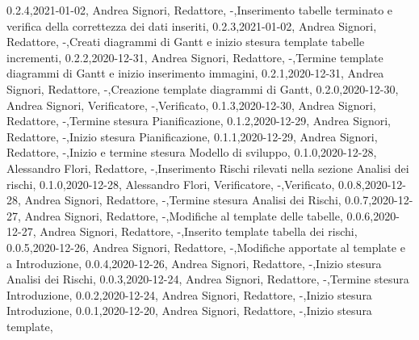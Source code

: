 {    {0.2.4,2021-01-02, Andrea Signori, Redattore, -,Inserimento tabelle terminato e verifica della correttezza dei dati inseriti},
    {0.2.3,2021-01-02, Andrea Signori, Redattore, -,Creati diagrammi di Gantt e inizio stesura template tabelle incrementi},
    {0.2.2,2020-12-31, Andrea Signori, Redattore, -,Termine template diagrammi di Gantt e inizio inserimento immagini},
    {0.2.1,2020-12-31, Andrea Signori, Redattore, -,Creazione template diagrammi di Gantt},
    {0.2.0,2020-12-30, Andrea Signori, Verificatore, -,Verificato},
    {0.1.3,2020-12-30, Andrea Signori, Redattore, -,Termine stesura Pianificazione},
    {0.1.2,2020-12-29, Andrea Signori, Redattore, -,Inizio stesura Pianificazione},
    {0.1.1,2020-12-29, Andrea Signori, Redattore, -,Inizio e termine stesura Modello di sviluppo},
    {0.1.0,2020-12-28, Alessandro Flori, Redattore, -,Inserimento Rischi rilevati nella sezione Analisi dei rischi},
    {0.1.0,2020-12-28, Alessandro Flori, Verificatore, -,Verificato},
    {0.0.8,2020-12-28, Andrea Signori, Redattore, -,Termine stesura Analisi dei Rischi},
    {0.0.7,2020-12-27, Andrea Signori, Redattore, -,Modifiche al template delle tabelle},
    {0.0.6,2020-12-27, Andrea Signori, Redattore, -,Inserito template tabella dei rischi},
    {0.0.5,2020-12-26, Andrea Signori, Redattore, -,Modifiche apportate al template e a Introduzione},
    {0.0.4,2020-12-26, Andrea Signori, Redattore, -,Inizio stesura Analisi dei Rischi},
    {0.0.3,2020-12-24, Andrea Signori, Redattore, -,Termine stesura Introduzione},
    {0.0.2,2020-12-24, Andrea Signori, Redattore, -,Inizio stesura Introduzione},
    {0.0.1,2020-12-20, Andrea Signori, Redattore, -,Inizio stesura template},
}
